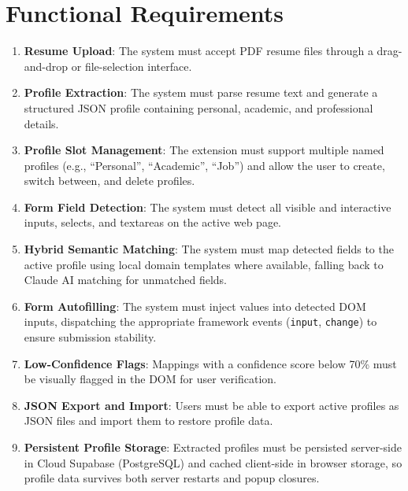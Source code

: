 \documentclass[12pt,a4paper]{report}
\begin{document}
\section{Functional Requirements}
\begin{enumerate}
    \item \textbf{Resume Upload}: The system must accept PDF resume files through a drag-and-drop or file-selection interface.
    \item \textbf{Profile Extraction}: The system must parse resume text and generate a structured JSON profile containing personal, academic, and professional details.
    \item \textbf{Profile Slot Management}: The extension must support multiple named profiles (e.g., ``Personal'', ``Academic'', ``Job'') and allow the user to create, switch between, and delete profiles.
    \item \textbf{Form Field Detection}: The system must detect all visible and interactive inputs, selects, and textareas on the active web page.
    \item \textbf{Hybrid Semantic Matching}: The system must map detected fields to the active profile using local domain templates where available, falling back to Claude AI matching for unmatched fields.
    \item \textbf{Form Autofilling}: The system must inject values into detected DOM inputs, dispatching the appropriate framework events (\texttt{input}, \texttt{change}) to ensure submission stability.
    \item \textbf{Low-Confidence Flags}: Mappings with a confidence score below 70\% must be visually flagged in the DOM for user verification.
    \item \textbf{JSON Export and Import}: Users must be able to export active profiles as JSON files and import them to restore profile data.
    \item \textbf{Persistent Profile Storage}: Extracted profiles must be persisted server-side in Cloud Supabase (PostgreSQL) and cached client-side in browser storage, so profile data survives both server restarts and popup closures.
\end{enumerate}
\end{document}
